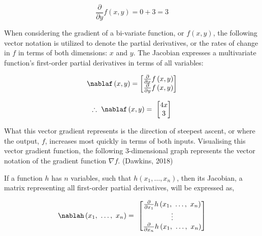 \documentclass[12pt,a4paper]{article}
\begin{document}
\begin{equation}
\frac{\partial}{\partial y}f\left(x,y\right) = 0 + 3 = 3
\end{equation}


When considering the gradient of a bi-variate function, or $f(x,y)$, the following vector notation is utilized to denote the partial derivatives, or the rates of change in $f$ in terms of both dimensions: $x$ and $y$. The Jacobian expresses a multivariate function’s first-order partial derivatives in terms of all variables:

\begin{equation}
\nablaf\left(x,y\right)=\left[\begin{matrix}\frac{\partial}{\partial x}f\left(x,y\right)\\\frac{\partial}{\partial  y}f\left(x,y\right)\\\end{matrix}\right]\end{equation}


\begin{equation}
\therefore\ \nablaf\left(x,y\right)=\ \left[\begin{matrix}4x\\3\\\end{matrix}\right]
\end{equation}

What this vector gradient represents is the direction of steepest ascent, or where the output, $f$, increases most quickly in terms of both inputs. Visualising this vector gradient function, the following 3-dimensional graph represents the vector notation of the gradient function $\nabla f$. (Dawkins, 2018)


If a function $h$ has $n$ variables, such that $h(x_1, …, x_n)$, then its Jacobian, a matrix representing all first-order partial derivatives, will be expressed as,

\begin{equation}
\nablah\left(x_1,\ \ldots,\ x_n\right)=\ \left[\begin{matrix}\frac{\partial}{\partial x_1}h\left(x_1,\ \ldots,\ x_n\right)\\\vdots\\\frac{\partial}{\partial x_n}h\left(x_1,\ \ldots,\ x_n\right)\\\end{matrix}\right]
\end{equation}
\end{document}
